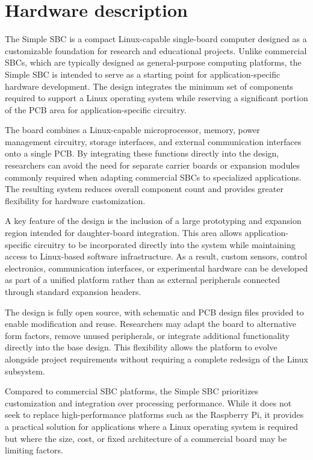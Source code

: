\section{Hardware description}

The Simple SBC is a compact Linux-capable single-board computer designed as a 
customizable foundation for research and educational projects. Unlike 
commercial SBCs, which are typically designed as general-purpose computing 
platforms, the Simple SBC is intended to serve as a starting point for 
application-specific hardware development. The design integrates the minimum 
set of components required to support a Linux operating system while reserving 
a significant portion of the PCB area for application-specific circuitry.

The board combines a Linux-capable microprocessor, memory, power management circuitry, 
storage interfaces, and external communication interfaces onto a single PCB. 
By integrating these functions directly into the design, researchers can avoid the need 
for separate carrier boards or expansion modules commonly required when adapting commercial 
SBCs to specialized applications. The resulting system reduces overall component count and 
provides greater flexibility for hardware customization.

A key feature of the design is the inclusion of a large prototyping and expansion region 
intended for daughter-board integration. This area allows application-specific circuitry 
to be incorporated directly into the system while maintaining access to Linux-based software 
infrastructure. As a result, custom sensors, control electronics, communication interfaces, 
or experimental hardware can be developed as part of a unified platform rather than as 
external peripherals connected through standard expansion headers.

The design is fully open source, with schematic and PCB design files provided to enable 
modification and reuse. Researchers may adapt the board to alternative form factors, 
remove unused peripherals, or integrate additional functionality directly into the base design. 
This flexibility allows the platform to evolve alongside project requirements without requiring 
a complete redesign of the Linux subsystem.

Compared to commercial SBC platforms, the Simple SBC prioritizes customization and integration 
over processing performance. While it does not seek to replace high-performance platforms 
such as the Raspberry Pi, it provides a practical solution for applications where a Linux 
operating system is required but where the size, cost, or fixed architecture of a commercial 
board may be limiting factors.

